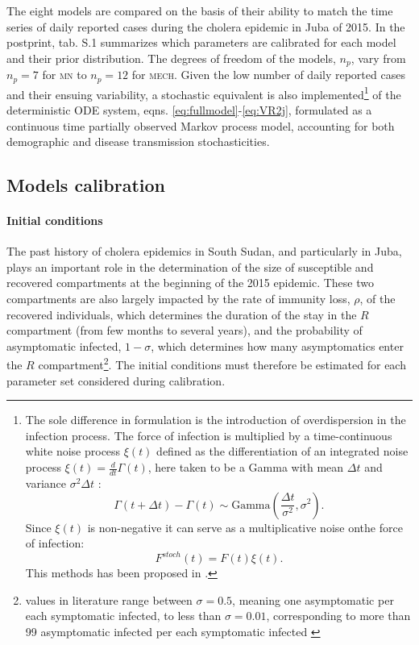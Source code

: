  The eight models are compared on the basis of their ability to match the time series of daily reported cases during the cholera epidemic in Juba of 2015. In the postprint, tab. S.1 summarizes which parameters are calibrated for each model and their prior distribution. The degrees of freedom of the models, $n_p$, vary from $n_p=7$ for \textsc{mn} to $n_p=12$ for \textsc{mech}. Given the low number of daily reported cases and their ensuing variability, a stochastic equivalent is also implemented\footnote[][-10\baselineskip]{The sole difference in formulation is the introduction of overdispersion in the infection process. The force of infection is multiplied by a time-continuous white noise process \(\xi(t)\) defined as the differentiation of an integrated noise process \(\xi(t) = \frac{d}{dt}\Gamma(t)\), here taken to be a Gamma with mean \(\Delta t\) and variance \(\sigma^2 \Delta t\) : \[
\Gamma (t+\Delta t) - \Gamma (t) \sim \text{Gamma}\left( \frac{\Delta t}{\sigma^2}, \sigma^2\right). \]
Since \(\xi(t)\) is non-negative it can serve as a multiplicative noise onthe force of infection: \[ F^{stoch}(t) = F(t) \xi(t). \]This methods has been proposed in .} of the deterministic ODE system, eqns. \eqref{eq:fullmodel}-\eqref{eq:VR2j}, formulated as a continuous time partially observed Markov process model, accounting for both demographic and disease transmission stochasticities\cite{Breto:TimeSeriesAnalysis:2009}. 

\subsection{Models calibration}
\paragraph{Initial conditions} The past history of cholera epidemics in South Sudan, and particularly in Juba, plays an important role in the determination of the size of susceptible and recovered compartments at the beginning of the 2015 epidemic. These two compartments are also largely impacted by the rate of immunity loss, $\rho$, of the recovered individuals, which determines the duration of the stay in the $R$ compartment (from few months to several years), and the probability of asymptomatic infected, $1-\sigma$, which determines how many asymptomatics enter the $R$ compartment\footnote{values in literature range between $\sigma=0.5$, meaning one asymptomatic per each symptomatic infected, to less than $\sigma=0.01$, corresponding to more than 99 asymptomatic infected per each symptomatic infected \parencite{Fung:CholeraTransmissionDynamic:2014}}. The initial conditions must therefore be estimated for each parameter set considered during calibration.
 
